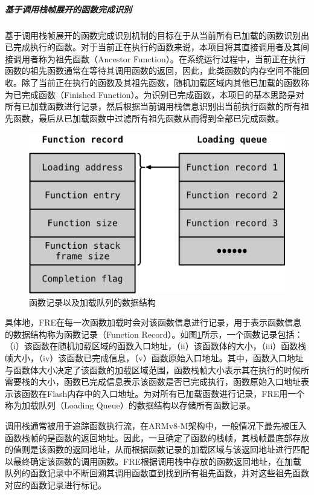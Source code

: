 \documentclass[12pt,a4paper]{ctexart}
\numberwithin{figure}{section}
\begin{document}
\subparagraph{基于调用栈帧展开的函数完成识别}
\par 基于调用栈帧展开的函数完成识别机制的目标在于从当前所有已加载的函数识别出已完成执行的函数。对于当前正在执行的函数来说，本项目将其直接调用者及其间接调用者称为祖先函数（Ancestor Function）。在系统运行过程中，当前正在执行函数的祖先函数通常在等待其调用函数的返回，因此，此类函数的内存空间不能回收。除了当前正在执行的函数及其祖先函数，随机加载区域内其他已加载的函数称为已完成函数（Finished Function）。为识别已完成函数，本项目的基本思路是对所有已加载函数进行记录，然后根据当前调用栈信息识别出当前执行函数的所有祖先函数，最后从已加载函数中过滤所有祖先函数从而得到全部已完成函数。
\begin{figure}[h]
    \centering
    \includegraphics[scale=0.7]{graph/dataStructure.png}
    \caption{函数记录以及加载队列的数据结构}
    \label{fig:dataStructure}
\end{figure}
\par 具体地，FRE在每一次函数加载时会对该函数信息进行记录，用于表示函数信息的数据结构称为函数记录（Function Record）。如图\ref{fig:dataStructure}所示，一个函数记录包括：（i）该函数在随机加载区域的函数入口地址，（ii）该函数体的大小，（iii）函数栈帧大小，（iv）该函数已完成信息，（v）函数原始入口地址。其中，函数入口地址与函数体大小决定了该函数的加载区域范围，函数栈帧大小表示其在执行的时候所需要栈的大小，函数已完成信息表示该函数是否已完成执行，函数原始入口地址表示该函数在Flash内存中的入口地址。为对所有已加载函数进行记录，FRE用一个称为加载队列（Loading Queue）的数据结构以存储所有函数记录。
\par 调用栈通常被用于追踪函数执行流，在ARMv8-M架构中，一般情况下最先被压入函数栈帧的是函数的返回地址。因此，一旦确定了函数的栈帧，其栈帧最底部存放的值则是该函数的返回地址，从而根据函数记录的加载区域与该返回地址进行匹配以最终确定该函数的调用函数。FRE根据调用栈中存放的函数返回地址，在加载队列的函数记录中不断回溯其调用函数直到找到所有祖先函数，并对这些祖先函数对应的函数记录进行标记。
\end{document}
